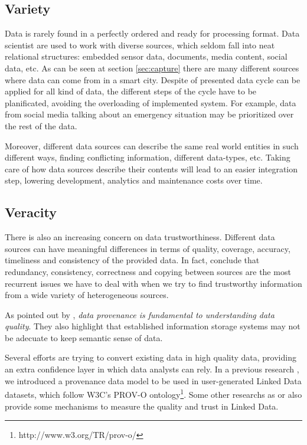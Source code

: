 \subsection{Variety}

Data is rarely found in a perfectly ordered and ready for processing format. Data scientist are used to work with diverse sources, which seldom fall into neat relational structures: embedded sensor data, documents, media content, social data, etc. As can be seen at section \ref{sec:capture} there are many different sources where data can come from in a smart city. Despite of presented data cycle can be applied for all kind of data, the different steps of the cycle have to be planificated, avoiding the overloading of implemented system. For example, data from social media talking about an emergency situation may be prioritized over the rest of the data.

Moreover, different data sources can describe the same real world entities in such different ways, finding conflicting information, different data-types, etc. Taking care of how data sources describe their contents will lead to an easier integration step, lowering development, analytics and maintenance costs over time. 

\subsection{Veracity}

There is also an increasing concern on data trustworthiness. Different data sources can have meaningful differences in terms of quality, coverage, accuracy, timeliness and consistency of the provided data. In fact, \cite{xian_truth_2013} conclude that redundancy, consistency, correctness and copying between sources are the most recurrent issues we have to deal with when we try to find trustworthy information from a wide variety of heterogeneous sources.

As pointed out by \cite{buneman2013data}, \textit{data provenance is fundamental to understanding data quality}. They also highlight that established information storage systems may not be adecuate to keep semantic sense of data.

Several efforts are trying to convert existing data in high quality data, providing an extra confidence layer in which data analysts can rely. In a previous research \cite{emalditrust}, we introduced a provenance data model to be used in user-generated Linked Data datasets, which follow W3C's PROV-O ontology\footnote{http://www.w3.org/TR/prov-o/}. Some other researchs as \cite{hartig_using_2009} or \cite{bizer_quality_2009} also provide some mechanisms to measure the quality and trust in Linked Data.

